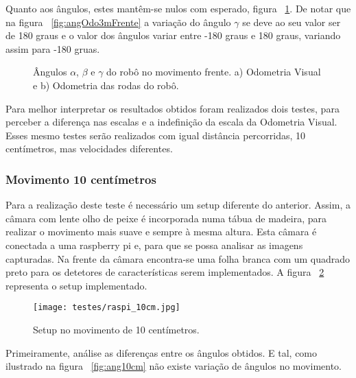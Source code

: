 Quanto aos ângulos, estes mantêm-se nulos com esperado,  figura ~\ref{fig:ang3mFrente}. De notar que na figura ~\ref{fig:angOdo3mFrente} a variação do ângulo $\gamma$ se deve ao seu valor ser de 180 graus e o valor dos ângulos variar entre -180 graus e 180 graus, variando assim para -180 gruas.

\begin{figure}[h!]
	\centering
	\qquad
	\caption{Ângulos $\alpha$, $\beta$ e $\gamma$ do robô no movimento frente. a) Odometria Visual e b) Odometria das rodas do robô.}
	\label{fig:ang3mFrente}
\end{figure}

Para melhor interpretar os resultados obtidos foram realizados dois testes, para perceber a diferença nas escalas e a indefinição da escala da Odometria Visual. Esses mesmo testes serão realizados com igual distância percorridas, 10 centímetros, mas velocidades diferentes.


\subsubsection{Movimento 10 centímetros}\label{subcaption:10cm}

Para a realização deste teste é necessário um setup diferente do anterior. Assim, a câmara com lente olho de peixe é incorporada numa tábua de madeira, para realizar o movimento mais suave e sempre à mesma altura. Esta câmara é conectada a uma raspberry pi e, para que se possa  analisar as imagens capturadas. Na frente da câmara encontra-se uma folha branca com um quadrado preto para os detetores de características serem implementados. A figura ~\ref{fig:setup10cm} representa o setup implementado.

\begin{figure}[h!]
	\begin{center}
		\leavevmode		
		\texttt{[image: testes/raspi\_10cm.jpg]}
		\caption{Setup no movimento de 10 centímetros.}
		\label{fig:setup10cm}
	\end{center}
\end{figure}
 


Primeiramente, análise as diferenças  entre os ângulos obtidos. E tal, como ilustrado na figura ~\ref{fig:ang10cm} não existe variação de ângulos no movimento.

